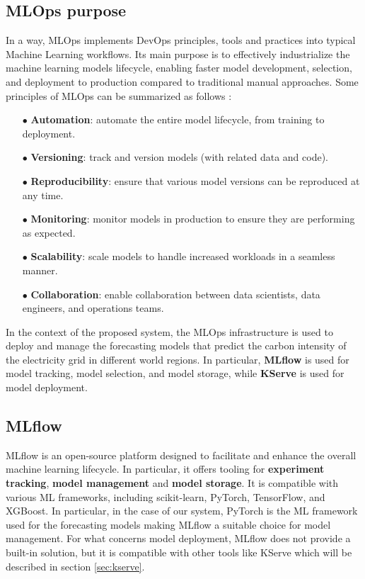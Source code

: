 \subsection{MLOps purpose}

In a way, MLOps implements DevOps principles, tools and practices into typical Machine Learning workflows.
Its main purpose is to effectively industrialize the machine learning models lifecycle, enabling faster model development, selection, and deployment to production compared to traditional manual approaches.
Some principles of MLOps can be summarized as follows \cite{mlops_ubuntu}:
\begin{itemize}[itemsep=0.2pt, topsep=1pt]
  \item[$\bullet$] \textbf{Automation}: automate the entire model lifecycle, from training to deployment.
  \item[$\bullet$] \textbf{Versioning}: track and version models (with related data and code).
  \item[$\bullet$] \textbf{Reproducibility}: ensure that various model versions can be reproduced at any time.
  \item[$\bullet$] \textbf{Monitoring}: monitor models in production to ensure they are performing as expected.
  \item[$\bullet$] \textbf{Scalability}: scale models to handle increased workloads in a seamless manner.
  \item[$\bullet$] \textbf{Collaboration}: enable collaboration between data scientists, data engineers, and operations teams.
\end{itemize}

In the context of the proposed system, the MLOps infrastructure is used to deploy and manage the forecasting models that predict the carbon intensity of the electricity grid in different world regions.
In particular, \textbf{MLflow} is used for model tracking, model selection, and model storage, while \textbf{KServe} is used for model deployment.

\subsection{MLflow}

MLflow is an open-source platform designed to facilitate and enhance the overall machine learning lifecycle. 
In particular, it offers tooling for \textbf{experiment tracking}, \textbf{model management} and \textbf{model storage}.
It is compatible with various ML frameworks, including scikit-learn, PyTorch, TensorFlow, and XGBoost.
In particular, in the case of our system, PyTorch is the ML framework used for the forecasting models making MLflow a suitable choice for model management.
For what concerns model deployment, MLflow does not provide a built-in solution, but it is compatible with other tools like KServe which will be described in section \ref{sec:kserve}.
